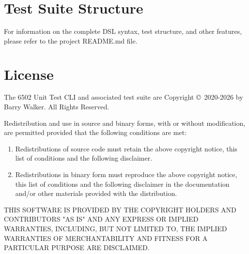 \documentclass[11pt,letterpaper]{article}
\begin{document}
\section{Test Suite Structure}

For information on the complete DSL syntax, test structure, and other features, please refer to the project README.md file.

\section{License}

The 6502 Unit Test CLI and associated test suite are Copyright \copyright\ 2020-2026 by Barry Walker. All Rights Reserved.

Redistribution and use in source and binary forms, with or without modification, are permitted provided that the following conditions are met:

\begin{enumerate}
    \item Redistributions of source code must retain the above copyright notice, this list of conditions and the following disclaimer.
    \item Redistributions in binary form must reproduce the above copyright notice, this list of conditions and the following disclaimer in the documentation and/or other materials provided with the distribution.
\end{enumerate}

THIS SOFTWARE IS PROVIDED BY THE COPYRIGHT HOLDERS AND CONTRIBUTORS "AS IS" AND ANY EXPRESS OR IMPLIED WARRANTIES, INCLUDING, BUT NOT LIMITED TO, THE IMPLIED WARRANTIES OF MERCHANTABILITY AND FITNESS FOR A PARTICULAR PURPOSE ARE DISCLAIMED.
\end{document}
